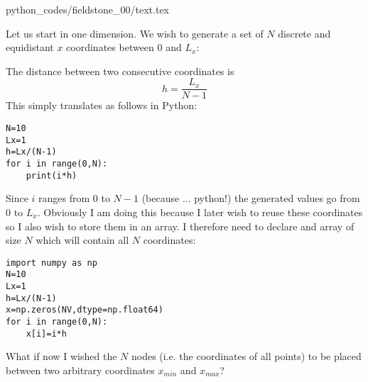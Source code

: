 \begin{flushright} {\tiny {\color{gray} python\_codes/fieldstone\_00/text.tex}} \end{flushright}


Let us start in one dimension. We wish to generate a 
set of $N$ discrete and equidistant $x$ coordinates 
between $0$ and $L_x$:

\begin{center}
\end{center}

\noindent
The distance between two consecutive coordinates is 
\[
h = \frac{L_x}{N-1}
\]
This simply translates as follows in Python:
\begin{lstlisting}
N=10
Lx=1
h=Lx/(N-1)
for i in range(0,N):
    print(i*h)
\end{lstlisting}

Since $i$ ranges from 0 to $N-1$ (because ... python!) the generated values go from 0 to $L_x$. 
Obviously I am doing this because I later wish to reuse these coordinates 
so I also wish to store them in an array.
I therefore need to declare and array of size $N$ which will 
contain all $N$ coordinates:
\begin{lstlisting}
import numpy as np
N=10
Lx=1
h=Lx/(N-1)
x=np.zeros(NV,dtype=np.float64)
for i in range(0,N):
    x[i]=i*h
\end{lstlisting}

What if now I wished the $N$ nodes (i.e. the coordinates of all points) to be placed between two arbitrary coordinates $x_{min}$ and $x_{max}$?

